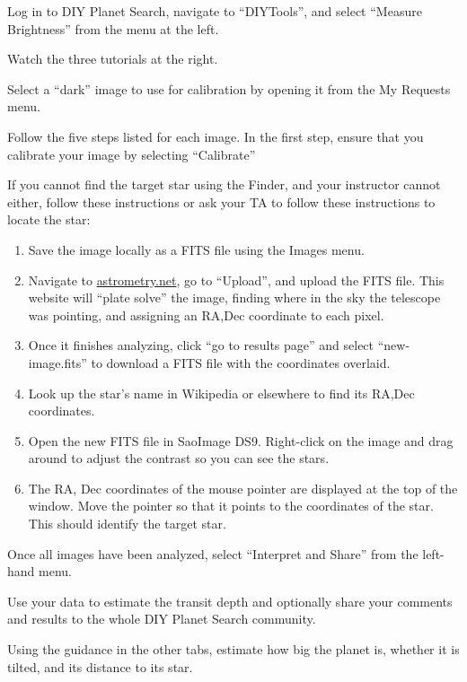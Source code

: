 \begin{steps}
	\item Log in to DIY Planet Search, navigate to ``DIYTools'', and select ``Measure Brightness'' from the menu at the left.
	
	\item Watch the three tutorials at the right.
	
	\item Select a ``dark'' image to use for calibration by opening it from the My Requests menu.
	
	\item Follow the five steps listed for each image. In the first step, ensure that you calibrate your image by selecting ``Calibrate''
	
	\item If you cannot find the target star using the Finder, and your instructor cannot either, follow these instructions or ask your TA to follow these instructions to locate the star:
	\begin{enumerate}
		\item Save the image locally as a FITS file using the Images menu.
		
		\item Navigate to \url{astrometry.net}, go to ``Upload'', and upload the FITS file. This website will ``plate solve'' the image, finding where in the sky the telescope was pointing, and assigning an RA,Dec coordinate to each pixel.
		
		\item Once it finishes analyzing, click ``go to results page'' and select ``new-image.fits'' to download a FITS file with the coordinates overlaid.
		
		\item Look up the star's name in Wikipedia or elsewhere to find its RA,Dec coordinates.
		
		\item Open the new FITS file in SaoImage DS9. Right-click on the image and drag around to adjust the contrast so you can see the stars.
		
		\item The RA, Dec coordinates of the mouse pointer are displayed at the top of the window. Move the pointer so that it points to the coordinates of the star. This should identify the target star.
	\end{enumerate}

	\item Once all images have been analyzed, select ``Interpret and Share'' from the left-hand menu.
	
	\item Use your data to estimate the transit depth and optionally share your comments and results to the whole DIY Planet Search community.
	
	\item Using the guidance in the other tabs, estimate how big the planet is, whether it is tilted, and its distance to its star.
\end{steps}

